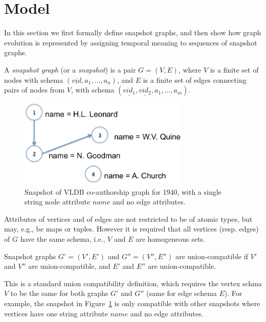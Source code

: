 \section{Model}
\label{sec:model}

In this section we first formally define snapshot graphs, and then
show how graph evolution is represented by assigning temporal meaning
to sequences of snapshot graphs.

\begin{definition}
\label{def:sg} 
A {\em snapshot graph} (or a {\em snapshot}) is a pair $G = (V,E)$,
where $V$ is a finite set of nodes with schema $(\underline{vid},
a_1, \ldots, a_n)$, and $E$ is a finite set of edges connecting
pairs of nodes from $V$, with schema $(\underline{vid_1},
\underline{vid_2}, a_1, \ldots, a_m)$.
\end{definition}

\begin{figure}
\label{fig:sg}
\includegraphics[width=3.2in]{figs/snapshot.pdf}
\caption{Snapshot of VLDB co-authorship graph for 1940, with a single string node attribute $name$ and no edge attributes.}
\end{figure}

Attributes of vertices and of edges are not restricted to be of atomic
types, but may, e.g., be maps or tuples. However it is required that
all vertices (resp. edges) of $G$ have the same schema, i.e., $V$ and
$E$ are homogeneous sets.

\begin{definition} 
\label{def:scompat}
Snapshot graphs $G' = (V', E')$ and $G'' = (V'', E'')$ are
union-compatible if $V'$ and $V''$ are union-compatible, and $E'$ and
$E''$ are union-compatible.
\end{definition}

This is a standard union compatibility definition, which requires the
vertex schma $V$ to be the same for both graphs $G'$ and $G''$ (same
for edge schema $E$).  For example, the snapshot in
Figure~\ref{fig:sg} is only compatible with other snapshots where
vertices have one string attribute $name$ and no edge attributes.


